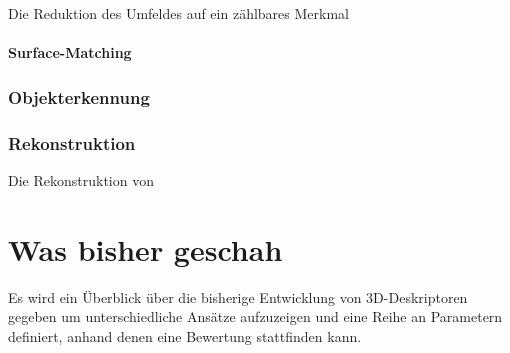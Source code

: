 \documentclass[12pt]{article}
\begin{document}
Die Reduktion des Umfeldes auf ein zählbares Merkmal 






\paragraph{Surface-Matching}



\subsubsection{Objekterkennung}\label{obj}

\subsubsection{Rekonstruktion}
Die Rekonstruktion von 






\section{Was bisher geschah}\label{past}
Es wird ein Überblick über die bisherige Entwicklung von 3D-Deskriptoren gegeben um unterschiedliche Ansätze aufzuzeigen und eine Reihe an Parametern definiert, anhand denen eine Bewertung stattfinden kann.
\end{document}

